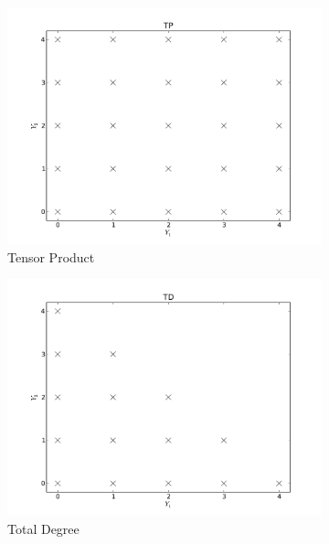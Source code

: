 \documentclass{mc2015}
\begin{document}
\begin{figure}[h]
\centering
  \begin{subfigure}[b]{0.32 \textwidth}
   \includegraphics[width=\textwidth]{TP}
   \caption{Tensor Product}
   \label{TP}
  \end{subfigure}
  \begin{subfigure}[b]{0.32 \textwidth}
   \includegraphics[width=\textwidth]{TD}
   \caption{Total Degree}
   \label{TD}
  \end{subfigure}
  \begin{subfigure}[b]{0.32 \textwidth}

\end{subfigure}
\end{figure}
\end{document}
